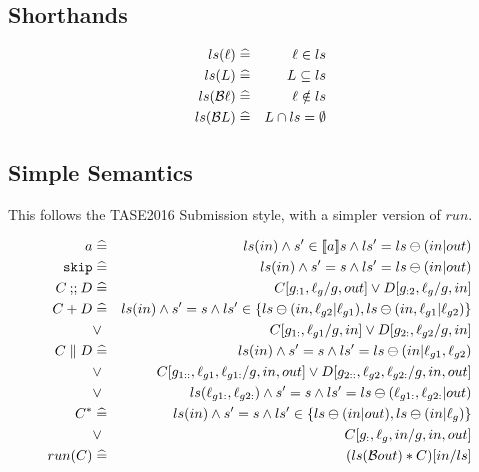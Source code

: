 \subsection{Shorthands}

\begin{eqnarray*}
   ls(\ell) &\mathrel{\widehat=}& \ell \in ls
\\ ls(L) &\mathrel{\widehat=}& L \subseteq ls
\\ ls(\mathcal{B}\ell) &\mathrel{\widehat=}& \ell \notin ls
\\ ls(\mathcal{B} L) &\mathrel{\widehat=}& L \cap ls = \emptyset
\end{eqnarray*}

\subsection{Simple Semantics}

This follows the TASE2016 Submission style,
with a simpler version of $run$.

\begin{eqnarray*}
   a
   &\mathrel{\widehat=}&
   ls(in) \land s' \in [\![{a}]\!] s \land ls'=ls \ominus (in|out)
\\ \texttt{skip}
   &\mathrel{\widehat=}&
   ls(in) \land s' = s \land ls'=ls \ominus (in|out)
\\ C \mathbin{;\!;} D
   &\mathrel{\widehat=}&
   C[g_{:1},\ell_g/g,out] \lor D[g_{:2},\ell_g/g,in]
\\ C + D
   &\mathrel{\widehat=}&
   ls(in)
   \land s' = s
   \land ls' \in \{ ls \ominus (in,\ell_{g2}|\ell_{g1})
                  , ls \ominus (in,\ell_{g1}|\ell_{g2})\}
\\ &\lor&
   C[g_{1:},\ell_{g1}/g,in] \lor D[g_{2:},\ell_{g2}/g,in]
\\ C \parallel D
   &\mathrel{\widehat=}&
   ls(in)
   \land s' = s
   \land ls'= ls \ominus (in|\ell_{g1},\ell_{g2})
\\ &\lor&
   C[g_{1::},\ell_{g1},\ell_{g1:}/g,in,out]
   \lor D[g_{2::},\ell_{g2},\ell_{g2:}/g,in,out]
\\ &\lor&
   ls(\ell_{g1:},\ell_{g2:})
   \land s' = s
   \land ls'= ls \ominus (\ell_{g1:},\ell_{g2:}|out)
\\ C^*
   &\mathrel{\widehat=}&
   ls(in)
   \land s' = s
   \land ls' \in \{ ls \ominus (in|out), ls \ominus (in|\ell_g)\}
\\ &\lor&
   C[g_{:},\ell_g,in/g,in,out]
\\ run(C)
   &\mathrel{\widehat=}&
   ( ls(\mathcal{B}{out}) * C)[in/ls]
\end{eqnarray*}
